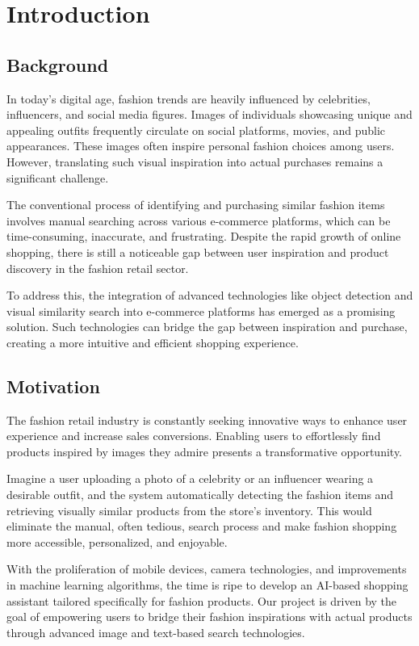 \chapter{Introduction}
\label{chap:introduction}

\section{Background}

In today's digital age, fashion trends are heavily influenced by celebrities, influencers, and social media figures. Images of individuals showcasing unique and appealing outfits frequently circulate on social platforms, movies, and public appearances. These images often inspire personal fashion choices among users. However, translating such visual inspiration into actual purchases remains a significant challenge.

The conventional process of identifying and purchasing similar fashion items involves manual searching across various e-commerce platforms, which can be time-consuming, inaccurate, and frustrating. Despite the rapid growth of online shopping, there is still a noticeable gap between user inspiration and product discovery in the fashion retail sector.

To address this, the integration of advanced technologies like object detection and visual similarity search into e-commerce platforms has emerged as a promising solution. Such technologies can bridge the gap between inspiration and purchase, creating a more intuitive and efficient shopping experience.

\section{Motivation}

The fashion retail industry is constantly seeking innovative ways to enhance user experience and increase sales conversions. Enabling users to effortlessly find products inspired by images they admire presents a transformative opportunity.

Imagine a user uploading a photo of a celebrity or an influencer wearing a desirable outfit, and the system automatically detecting the fashion items and retrieving visually similar products from the store's inventory. This would eliminate the manual, often tedious, search process and make fashion shopping more accessible, personalized, and enjoyable.

With the proliferation of mobile devices, camera technologies, and improvements in machine learning algorithms, the time is ripe to develop an AI-based shopping assistant tailored specifically for fashion products. Our project is driven by the goal of empowering users to bridge their fashion inspirations with actual products through advanced image and text-based search technologies.

